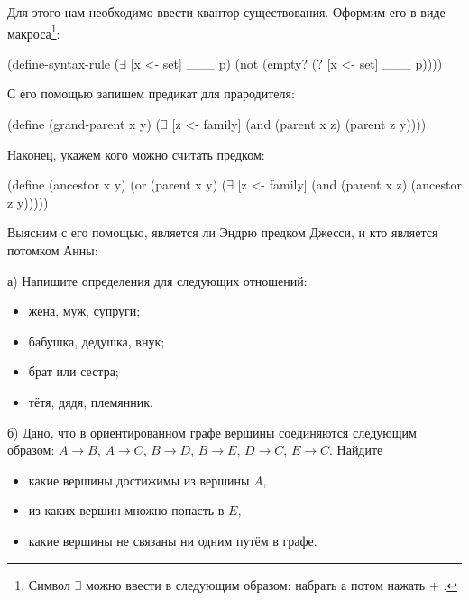 Для этого нам необходимо ввести квантор существования. Оформим его в виде макроса\footnote{Символ $\exists$ можно ввести в  следующим образом: набрать \s{\\exists} а потом нажать  + \s{\\}.}:

\begin{Definition}[emph={x,set,p}]
(define-syntax-rule ($\exists$ [x <- set] ___ p)
  (not (empty? (? [x <- set] ___ p)))) 
\end{Definition}

С его помощью запишем предикат для прародителя:
\begin{Definition}[emph={x,y,z}]
(define (grand-parent x y)
  ($\exists$ [z <- family] (and (parent x z) (parent z y))))
\end{Definition}

Наконец, укажем кого можно считать предком:
\begin{Definition}[emph={x,y,z}]
(define (ancestor x y) 
  (or (parent x y)
      ($\exists$ [z <- family] (and (parent x z) (ancestor z y)))))  
\end{Definition}

Выясним с его помощью, является ли Эндрю предком Джесси, и кто является потомком Анны:

\newpage
\begin{Assignment}
а)  Напишите определения для следующих отношений:
\begin{itemize}
  \item жена, муж, супруги;
  \item бабушка, дедушка,  внук;
  \item брат или сестра;
  \item тётя, дядя, племянник.
\end{itemize}

\medskip
б)  Дано, что в ориентированном графе вершины соединяются следующим образом: $A\to B$, $A\to C$, $B\to D$, $B\to E$, $D\to C$, $E\to C$. Найдите
\begin{itemize}
\item какие вершины достижимы из вершины $A$,
\item из каких вершин множно попасть в $E$,
\item какие вершины не связаны ни одним путём в графе.
\end{itemize}
\end{Assignment}


